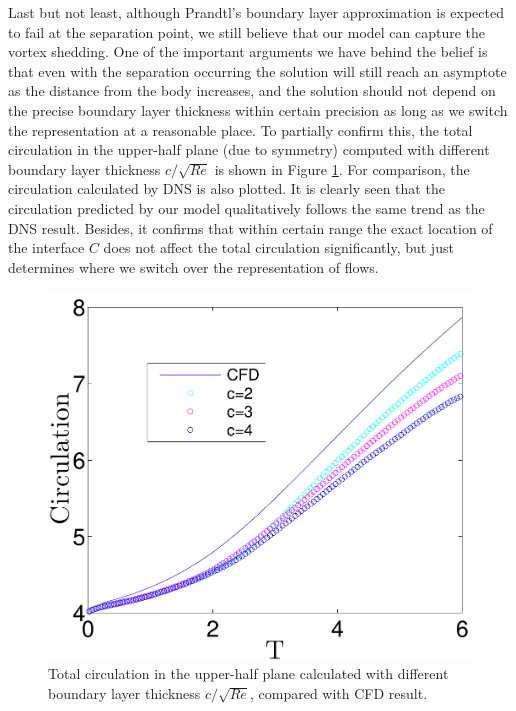 Last but not least, although Prandtl's boundary layer approximation is expected to fail at the separation point, we still believe that our model can capture the vortex shedding.
One of the important arguments we have behind the belief is that even with the separation occurring the solution will still reach an asymptote as the distance from the body increases, and  the solution should not depend on the precise boundary layer thickness within certain precision as long as we switch the representation at a reasonable place.
To partially confirm this, the total circulation in the upper-half plane (due to symmetry) computed with different boundary layer thickness $c/\sqrt{Re}$ is shown in Figure \ref{fig:Circulation}.
For comparison, the circulation calculated by DNS is also plotted.
It is clearly seen that the circulation predicted by our model qualitatively follows the same trend as the DNS result.
Besides, it confirms  that within certain range the exact location of the interface $C$ does not affect the total circulation significantly, but just determines where we switch over the representation of flows.

\begin{figure}
\begin{center}
\includegraphics[width=12cm]{./Figures/results/static/Circulation.pdf}
\end{center}
\caption[Total circulation in the upper-half plane]{Total circulation in the upper-half plane calculated with different boundary layer thickness $c/\sqrt{Re}$, compared with CFD result.}
\label{fig:Circulation}
\end{figure}


